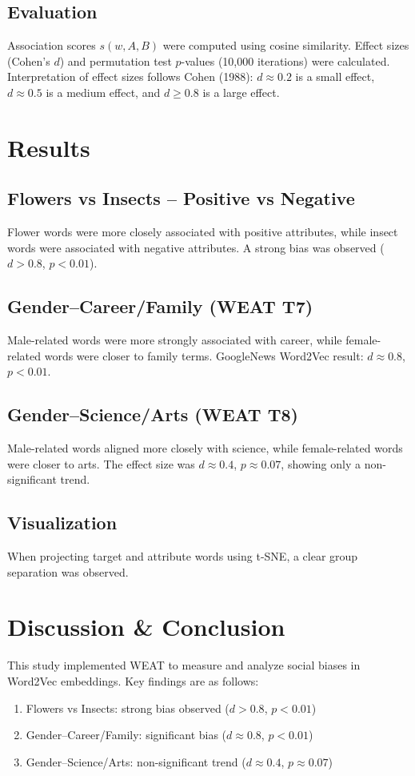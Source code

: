 \documentclass[12pt,a4paper]{article}
\begin{document}
\subsection{Evaluation}
Association scores $s(w,A,B)$ were computed using cosine similarity. 
Effect sizes (Cohen’s $d$) and permutation test $p$-values (10,000 iterations) were calculated. 
Interpretation of effect sizes follows Cohen (1988): 
$d \approx 0.2$ is a small effect, 
$d \approx 0.5$ is a medium effect, 
and $d \geq 0.8$ is a large effect.

\section{Results}
\subsection{Flowers vs Insects -- Positive vs Negative}
Flower words were more closely associated with positive attributes, 
while insect words were associated with negative attributes. 
A strong bias was observed ($d > 0.8$, $p < 0.01$).

\subsection{Gender--Career/Family (WEAT T7)}
Male-related words were more strongly associated with career, 
while female-related words were closer to family terms.  
GoogleNews Word2Vec result: $d \approx 0.8$, $p < 0.01$.

\subsection{Gender--Science/Arts (WEAT T8)}
Male-related words aligned more closely with science, 
while female-related words were closer to arts.  
The effect size was $d \approx 0.4$, $p \approx 0.07$, 
showing only a non-significant trend.

\subsection{Visualization}
When projecting target and attribute words using t-SNE, 
a clear group separation was observed.

\section{Discussion \& Conclusion}
This study implemented WEAT to measure and analyze social biases in Word2Vec embeddings. 
Key findings are as follows:
\begin{enumerate}[leftmargin=2em]
  \item Flowers vs Insects: strong bias observed ($d > 0.8$, $p < 0.01$)
  \item Gender--Career/Family: significant bias ($d \approx 0.8$, $p < 0.01$)
  \item Gender--Science/Arts: non-significant trend ($d \approx 0.4$, $p \approx 0.07$)
\end{enumerate}
\end{document}
